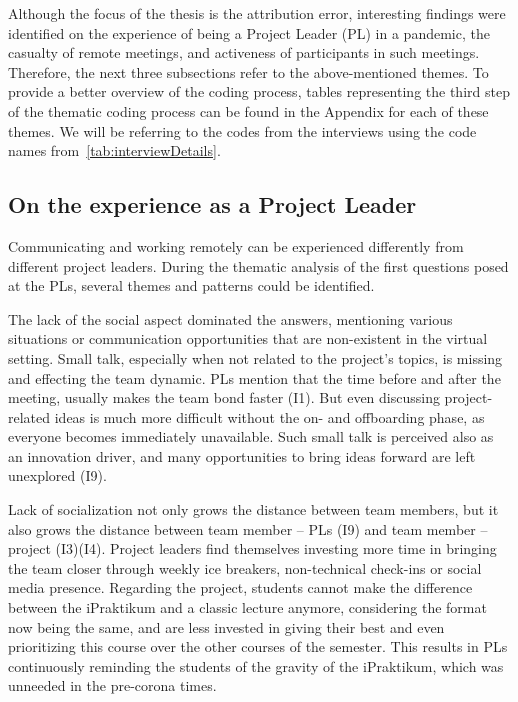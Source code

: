 Although the focus of the thesis is the attribution error, interesting findings were identified on the experience of being a Project Leader (PL) in a pandemic, the casualty of remote meetings, and activeness of participants in such meetings. Therefore, the next three subsections refer to the above-mentioned themes. To provide a better overview of the coding process, tables representing the third step of the thematic coding process can be found in the Appendix for each of these themes. We will be referring to the codes from the interviews using the code names from~\autoref{tab:interviewDetails}.

\subsection{On the experience as a Project Leader}

Communicating and working remotely can be experienced differently from different project leaders. During the thematic analysis of the first questions posed at the PLs, several themes and patterns could be identified.

The lack of the social aspect dominated the answers, mentioning various situations or communication opportunities that are non-existent in the virtual setting. Small talk, especially when not related to the project’s topics, is missing and effecting the team dynamic. PLs mention that the time before and after the meeting, usually makes the team bond faster (I1). But even discussing project-related ideas is much more difficult without the on- and offboarding phase, as everyone becomes immediately unavailable. Such small talk is perceived also as an innovation driver, and many opportunities to bring ideas forward are left unexplored (I9). 

Lack of socialization not only grows the distance between team members, but it also grows the distance between team member – PLs (I9) and team member – project (I3)(I4). Project leaders find themselves investing more time in bringing the team closer through weekly ice breakers, non-technical check-ins or social media presence. Regarding the project, students cannot make the difference between the iPraktikum and a classic lecture anymore, considering the format now being the same, and are less invested in giving their best and even prioritizing this course over the other courses of the semester. This results in PLs continuously reminding the students of the gravity of the iPraktikum, which was unneeded in the pre-corona times.

